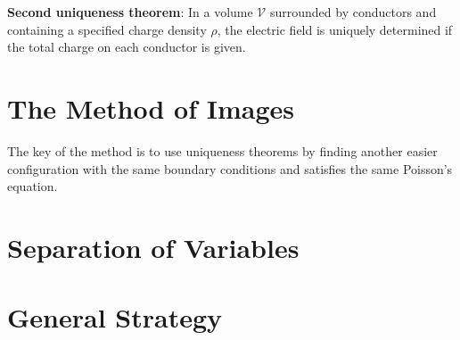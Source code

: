 \documentclass{report}
\begin{document}
\textbf{Second uniqueness theorem}: In a volume $\mathcal{V}$ surrounded by conductors and containing a specified charge density $\rho$, the electric field is uniquely determined if the total charge on each conductor is given. 

\section{The Method of Images}
The key of the method is to use uniqueness theorems by finding another easier configuration with the same boundary conditions and satisfies the same Poisson's equation. 

\section{Separation of Variables}
\section{General Strategy}
\end{document}
